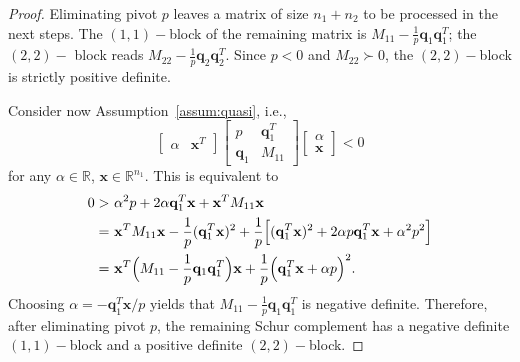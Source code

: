 \documentclass[10pt,a4paper]{amsart}
\newcommand{\qvec}{\mathbf q}
\newcommand{\xvec}{\mathbf x}
\begin{document}
\begin{proof}
Eliminating pivot $p$ leaves a matrix of size $n_1+n_2$ to be processed in the next steps. The $(1,1)-$block of the remaining matrix is $M_{11}-\frac{1}{p}\qvec_1\qvec_1^T$; the $(2,2)-$ block reads $M_{22}-\frac{1}{p}\qvec_2\qvec_2^T$. Since $p<0$ and $M_{22}\succ0$, the $(2,2)-$block is strictly positive definite. 

Consider now Assumption~\ref{assum:quasi}, i.e.,
\[
\begin{bmatrix}
\alpha & \xvec^T
\end{bmatrix}
\begin{bmatrix}
p & \qvec_1^T \\ \qvec_1 & M_{11}
\end{bmatrix}
\begin{bmatrix}
\alpha \\ \xvec
\end{bmatrix}
<0
\]
for any $\alpha\in\mathbb R$, $\xvec\in\mathbb R^{n_1}$. This is equivalent to 
\begin{align}
0>\,\,& \alpha^2p+2\alpha \qvec_1^T\xvec +\xvec^TM_{11}\xvec \notag\\
=\,\,& \xvec^TM_{11}\xvec-\frac{1}{p}(\qvec_1^T\xvec)^2+\frac{1}{p}\Big[(\qvec_1^T\xvec)^2+2\alpha p \qvec_1^T\xvec+\alpha^2 p^2\Big] \notag\\
=\,\,& \xvec^T\Big(M_{11}-\frac{1}{p}\qvec_1\qvec_1^T\Big)\xvec+\frac{1}{p}\Big(\qvec_1^T\xvec+\alpha p\Big)^2 \notag.
\end{align}
Choosing $\alpha=-\qvec_1^T\xvec/p$ yields that $M_{11}-\frac{1}{p}\qvec_1\qvec_1^T$ is negative definite. Therefore, after eliminating pivot $p$, the remaining Schur complement has a negative definite $(1,1)-$block and a positive definite $(2,2)-$block.
\end{proof}
\end{document}
